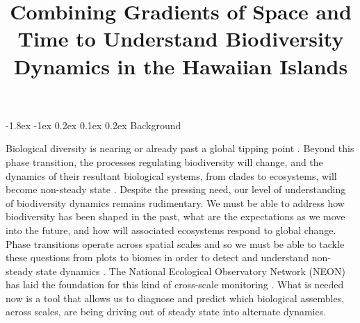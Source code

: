 \documentclass[11pt]{article}
\title{Combining Gradients of Space and Time to Understand
  Biodiversity Dynamics in the Hawaiian Islands \vspace{-1.5ex}}
\author{}
\date{}
\makeatletter
\renewcommand\section{\@startsection{section}{1}{\z@}%
                                  {-1.8ex \@plus -1ex \@minus 0.2ex}%
                                  {0.1ex \@plus 0.2ex}%
                                  {\normalfont\Large\bfseries}}
\makeatother
\begin{document}
\maketitle
\thispagestyle{fancy} 
\vspace{-4em}

%
%

\section{Background}

Biological diversity is nearing or already past a global tipping point
\citep{barnosky2012}. Beyond this phase transition, the processes
regulating biodiversity will change, and the dynamics of their
resultant biological systems, from clades to ecosystems, will become
non-steady state \citep{barnosky2012}.  Despite the pressing need, our
level of understanding of biodiversity dynamics remains rudimentary.
We must be able to address how biodiversity has been shaped in the
past, what are the expectations as we move into the future, and how
will associated ecosystems respond to global change. Phase transitions
operate across spatial scales and so we must be able to tackle these
questions from plots to biomes in order to detect and understand
non-steady state dynamics \citep{heffernan2014, soranno2014}. The
National Ecological Observatory Network (NEON) has laid the foundation
for this kind of cross-scale monitoring \citep{heffernan2014, NEON}.
What is needed now is a tool that allows us to diagnose and predict
which biological assembles, across scales, are being driving out of
steady state into alternate dynamics.
\end{document}
